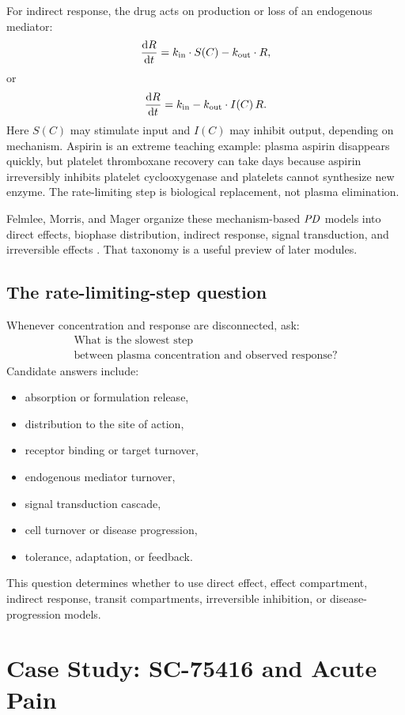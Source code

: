 \documentclass[a4paper]{article}
\newcommand{\PD}{\ensuremath{\pksym{PD}}}
\begin{document}
For indirect response, the drug acts on production or loss of an endogenous mediator:
\[
  \frac{\mathop{}\!\mathrm{d} R}{\mathop{}\!\mathrm{d} t}
  =
  k_{\mathrm{in}}\cdot S(C)
  -
  k_{\mathrm{out}}\cdot R,
\]
or
\[
  \frac{\mathop{}\!\mathrm{d} R}{\mathop{}\!\mathrm{d} t}
  =
  k_{\mathrm{in}}
  -
  k_{\mathrm{out}}\cdot I(C)\,R.
\]
Here \(S(C)\) may stimulate input and \(I(C)\) may inhibit output, depending on mechanism. Aspirin is an extreme teaching example: plasma aspirin disappears quickly, but platelet thromboxane recovery can take days because aspirin irreversibly inhibits platelet cyclooxygenase and platelets cannot synthesize new enzyme. The rate-limiting step is biological replacement, not plasma elimination.

Felmlee, Morris, and Mager organize these mechanism-based \PD{} models into direct effects, biophase distribution, indirect response, signal transduction, and irreversible effects \cite{felmlee2012mechanism}. That taxonomy is a useful preview of later modules.

\subsection{The rate-limiting-step question}

Whenever concentration and response are disconnected, ask:
\[
  \begin{gathered}
    \text{What is the slowest step}\\
    \text{between plasma concentration and observed response?}
  \end{gathered}
\]
Candidate answers include:
\begin{itemize}[leftmargin=2em]
  \item absorption or formulation release,
  \item distribution to the site of action,
  \item receptor binding or target turnover,
  \item endogenous mediator turnover,
  \item signal transduction cascade,
  \item cell turnover or disease progression,
  \item tolerance, adaptation, or feedback.
\end{itemize}
This question determines whether to use direct effect, effect compartment, indirect response, transit compartments, irreversible inhibition, or disease-progression models.

\section{Case Study: SC-75416 and Acute Pain}
\end{document}
